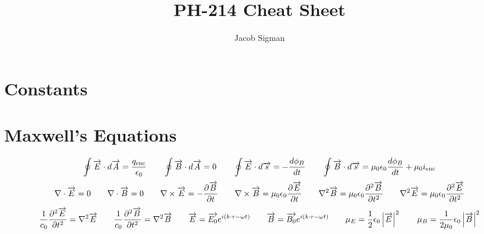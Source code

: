 \documentclass{article}
\title{PH-214 Cheat Sheet}
\author{Jacob Sigman}
\date{}
\begin{document}
\maketitle
\section*{Constants}

\section*{Maxwell's Equations}
\[\oint\overrightarrow{E}\cdot d\overrightarrow{A}=\frac{q_{\textnormal{enc}}}{\epsilon_0}\hspace{7 mm}\oint\overrightarrow{B}\cdot d\overrightarrow{A}=0\hspace{7 mm}\oint\overrightarrow{E}\cdot d\overrightarrow{s}=-\frac{d\phi_B}{dt}\hspace{7 mm}\oint\overrightarrow{B}\cdot d\overrightarrow{s}=\mu_0\epsilon_0\frac{d\phi_B}{dt}+\mu_0i_{\textnormal{enc}}\]
\[\nabla\cdot\overrightarrow{E}=0\hspace{7 mm}\nabla\cdot\overrightarrow{B}=0\hspace{7 mm}\nabla\times\overrightarrow{E}=-\frac{\partial\overrightarrow{B}}{\partial t}\hspace{7 mm}\nabla\times\overrightarrow{B}=\mu_0\epsilon_0\frac{\partial\overrightarrow{E}}{\partial t}\hspace{7 mm}\nabla^2\overrightarrow{B}=\mu_0\epsilon_0\frac{\partial^2\overrightarrow{B}}{\partial t^2}\hspace{7 mm}\nabla^2\overrightarrow{E}=\mu_0\epsilon_0\frac{\partial^2\overrightarrow{E}}{\partial t^2}\]
\[\frac{1}{c_0}\frac{\partial^2\overrightarrow{E}}{\partial t^2}=\nabla^2\overrightarrow{E}\hspace{7 mm}\frac{1}{c_0}\frac{\partial^2\overrightarrow{B}}{\partial t^2}=\nabla^2\overrightarrow{B}\hspace{7 mm}\overrightarrow{E}=\overrightarrow{E_0}e^{i(k\cdot r-\omega t)}\hspace{7 mm}\overrightarrow{B}=\overrightarrow{B_0}e^{i(k\cdot r-\omega t)}\hspace{7 mm}\mu_E=\frac{1}{2}\epsilon_0\left|\overrightarrow{E}\right|^2\hspace{7 mm}\mu_B=\frac{1}{2\mu_0}\epsilon_0\left|\overrightarrow{B}\right|^2\]
\end{document}
